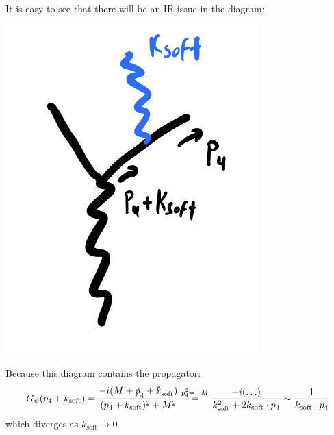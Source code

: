 It is easy to see that there will be an IR issue in the diagram:

\begin{center}
    \includegraphics[scale=0.35]{Lectures/Images/lec14-softzoom.png}
\end{center}

Because this diagram contains the propagator:
\begin{equation}
    G_\psi(p_4 + k_{\text{soft}}) = \frac{-i(M + \slashed{p}_4 + \slashed{k}_{\text{soft}})}{(p_4 + k_{\text{soft}})^2 + M^2} \stackrel{p_4^2 = -M}{=} \frac{-i(\ldots)}{k_{\text{soft}}^2 + 2k_{\text{soft}} \cdot p_4} \sim \frac{1}{k_{\text{soft}} \cdot p_4}
\end{equation}
which diverges as $k_{\text{soft}} \to 0$.

